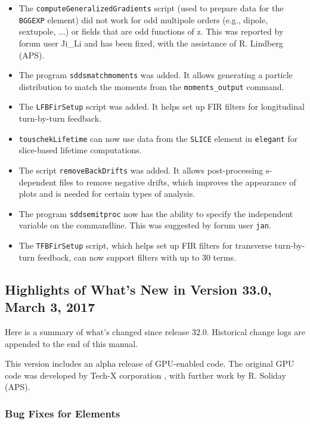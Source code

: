 \documentclass[11pt]{article}
\begin{document}
\begin{itemize}
\item The \verb|computeGeneralizedGradients| script (used to prepare data for the \verb|BGGEXP| element) did not work
  for odd multipole orders (e.g., dipole, sextupole, ...) or fields that are odd functions of z. 
  This was reported by forum user Ji\_Li and has been fixed, with the assistance of R. Lindberg (APS).
\item The program \verb|sddsmatchmoments| was added. It allows generating a particle distribution to match the
  moments from the \verb|moments_output| command.
\item The \verb|LFBFirSetup| script was added. It helps set up FIR filters for longitudinal turn-by-turn feedback.
\item \verb|touschekLifetime| can now use data from the \verb|SLICE| element in {\tt elegant} for slice-based lifetime computations.
\item The script \verb|removeBackDrifts| was added. It allows post-processing s-dependent files to remove negative drifts, which
  improves the appearance of plots and is needed for certain types of analysis.
\item The program \verb|sddsemitproc| now has the ability to specify the independent variable on the commandline. This was
  suggested by forum user \verb|jan|.
\item The \verb|TFBFirSetup| script, which helps set up FIR filters for transverse turn-by-turn feedback, can now
  support filters with up to 30 terms.
\end{itemize}

\subsection{Highlights of What's New in Version 33.0, March 3, 2017}

Here is a summary of what's changed since release 32.0.
Historical change logs are appended to the end of this manual.

This version includes an alpha release of GPU-enabled code. The original GPU code was developed by 
Tech-X corporation \cite{GPU1}, with further work by R. Soliday (APS).

\subsubsection{Bug Fixes for Elements}
\end{document}

